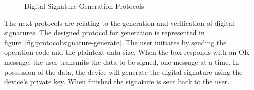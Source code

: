 \hfill
\hfill
\begin{figure}
	\centering     %
	\caption{Digital Signature Generation Protocols}
\end{figure}

The next protocols are relating to the generation and verification of digital signatures.
The designed protocol for generation is represented in figure~\ref{fig:protocol:signature-generate}.
The user initiates by sending the operation code and the plaintext data size.
When the box responds with an OK message, the user transmits the data to be signed, one message at a time.
In possession of the data, the device will generate the digital signature using the device's private key. When finished the signature is sent back to the user.

